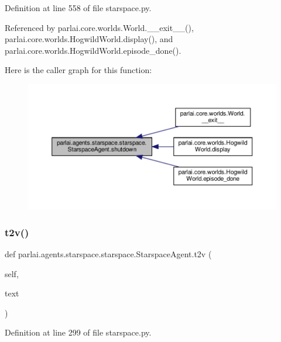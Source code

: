 Definition at line 558 of file starspace.\+py.



Referenced by parlai.\+core.\+worlds.\+World.\+\_\+\+\_\+exit\+\_\+\+\_\+(), parlai.\+core.\+worlds.\+Hogwild\+World.\+display(), and parlai.\+core.\+worlds.\+Hogwild\+World.\+episode\+\_\+done().

Here is the caller graph for this function\+:
\nopagebreak
\begin{figure}[H]
\begin{center}
\leavevmode
\includegraphics[width=350pt]{classparlai_1_1agents_1_1starspace_1_1starspace_1_1StarspaceAgent_a4016a83cf0ed9ed97c8b94d9eacbcae3_icgraph}
\end{center}
\end{figure}
\mbox{\label{classparlai_1_1agents_1_1starspace_1_1starspace_1_1StarspaceAgent_ad38444615578df64d2e341b2ce37a012}} 
\subsubsection{\texorpdfstring{t2v()}{t2v()}}
{\footnotesize\ttfamily def parlai.\+agents.\+starspace.\+starspace.\+Starspace\+Agent.\+t2v (\begin{DoxyParamCaption}\item[{}]{self,  }\item[{}]{text }\end{DoxyParamCaption})}



Definition at line 299 of file starspace.\+py.



